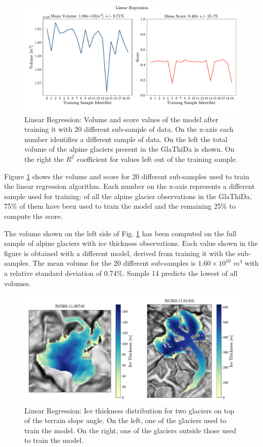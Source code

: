 \begin{figure}[!tp]
	\centering		  
	\includegraphics[width=1.\textwidth]{figures/LR_score.pdf}
	\caption{Linear Regression: Volume and score values of the model after training it with 20 different sub-sample of data. On the x-axis each number identifies a different sample of data. On the left the total volume of the alpine glaciers present in the GlaThiDa is shown. On the right the $R^2$ coefficient for values left out of the training sample.}
	\label{fig:lr-score}
\end{figure}

Figure \ref{fig:lr-score} shows the volume and score for 20 different sub-samples used to train the linear regression algorithm. Each number on the x-axis represents a different sample used for training: of all the alpine glacier observations in the GlaThiDa, 75\% of them have been used to train the model and the remaining 25\% to compute the score. 

The volume shown on the left side of Fig. \ref{fig:lr-score} has been computed on the full sample of alpine glaciers with ice thickness observations. Each value shown in the figure is obtained with a different model, derived from training it with the sub-samples. The mean volume for the 20 different sub-samples is $1.60\times 10^{10}$ $m^3$ with a relative standard deviation of 0.74\%. Sample 14 predicts the lowest of all volumes.

\begin{figure}[!tp]
	\centering		  
	\includegraphics[width=1.\textwidth]{figures/LR_thick_map.pdf}
	\caption{Linear Regression: Ice thickness distribution for two glaciers on top of the terrain slope angle. On the left, one of the glaciers used to train the model. On the right, one of the glaciers outside those used to train the model.}
	\label{fig:lr-map}
\end{figure}

